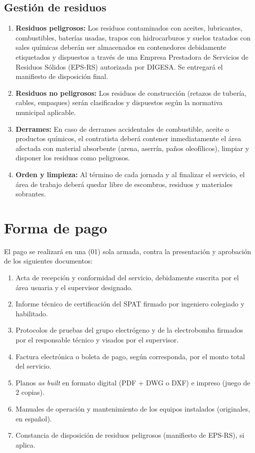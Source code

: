 \documentclass[12pt,a4paper]{article}
\begin{document}
\subsection{Gestión de residuos}

\begin{enumerate}
  \item \textbf{Residuos peligrosos:} Los residuos contaminados con aceites, lubricantes, combustibles, baterías usadas, trapos con hidrocarburos y suelos tratados con sales químicas deberán ser almacenados en contenedores debidamente etiquetados y dispuestos a través de una Empresa Prestadora de Servicios de Residuos Sólidos (EPS-RS) autorizada por DIGESA. Se entregará el manifiesto de disposición final.
  \item \textbf{Residuos no peligrosos:} Los residuos de construcción (retazos de tubería, cables, empaques) serán clasificados y dispuestos según la normativa municipal aplicable.
  \item \textbf{Derrames:} En caso de derrames accidentales de combustible, aceite o productos químicos, el contratista deberá contener inmediatamente el área afectada con material absorbente (arena, aserrín, paños oleofílicos), limpiar y disponer los residuos como peligrosos.
  \item \textbf{Orden y limpieza:} Al término de cada jornada y al finalizar el servicio, el área de trabajo deberá quedar libre de escombros, residuos y materiales sobrantes.
\end{enumerate}

\section{Forma de pago}

El pago se realizará en una (01) sola armada, contra la presentación y aprobación de los siguientes documentos:

\begin{enumerate}
  \item Acta de recepción y conformidad del servicio, debidamente suscrita por el área usuaria y el supervisor designado.
  \item Informe técnico de certificación del SPAT firmado por ingeniero colegiado y habilitado.
  \item Protocolos de pruebas del grupo electrógeno y de la electrobomba firmados por el responsable técnico y visados por el supervisor.
  \item Factura electrónica o boleta de pago, según corresponda, por el monto total del servicio.
  \item Planos \emph{as built} en formato digital (PDF + DWG o DXF) e impreso (juego de 2 copias).
  \item Manuales de operación y mantenimiento de los equipos instalados (originales, en español).
  \item Constancia de disposición de residuos peligrosos (manifiesto de EPS-RS), si aplica.
\end{enumerate}
\end{document}
